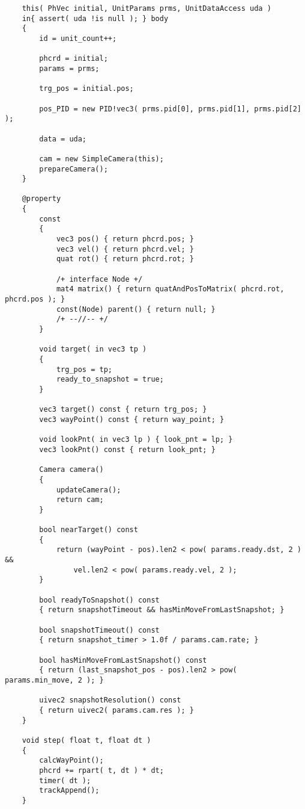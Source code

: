\begin{verbatim}
    this( PhVec initial, UnitParams prms, UnitDataAccess uda )
    in{ assert( uda !is null ); } body
    {
        id = unit_count++;

        phcrd = initial;
        params = prms;

        trg_pos = initial.pos;

        pos_PID = new PID!vec3( prms.pid[0], prms.pid[1], prms.pid[2] );

        data = uda;

        cam = new SimpleCamera(this);
        prepareCamera();
    }

    @property
    {
        const
        {
            vec3 pos() { return phcrd.pos; }
            vec3 vel() { return phcrd.vel; }
            quat rot() { return phcrd.rot; }

            /+ interface Node +/
            mat4 matrix() { return quatAndPosToMatrix( phcrd.rot, phcrd.pos ); }
            const(Node) parent() { return null; }
            /+ --//-- +/
        }
        
        void target( in vec3 tp )
        {
            trg_pos = tp;
            ready_to_snapshot = true;
        }

        vec3 target() const { return trg_pos; }
        vec3 wayPoint() const { return way_point; }

        void lookPnt( in vec3 lp ) { look_pnt = lp; }
        vec3 lookPnt() const { return look_pnt; }

        Camera camera()
        {
            updateCamera();
            return cam;
        }

        bool nearTarget() const
        {
            return (wayPoint - pos).len2 < pow( params.ready.dst, 2 ) &&
                vel.len2 < pow( params.ready.vel, 2 );
        }

        bool readyToSnapshot() const
        { return snapshotTimeout && hasMinMoveFromLastSnapshot; }

        bool snapshotTimeout() const
        { return snapshot_timer > 1.0f / params.cam.rate; }

        bool hasMinMoveFromLastSnapshot() const
        { return (last_snapshot_pos - pos).len2 > pow( params.min_move, 2 ); }

        uivec2 snapshotResolution() const
        { return uivec2( params.cam.res ); }
    }

    void step( float t, float dt )
    {
        calcWayPoint();
        phcrd += rpart( t, dt ) * dt;
        timer( dt );
        trackAppend();
    }


\end{verbatim}
